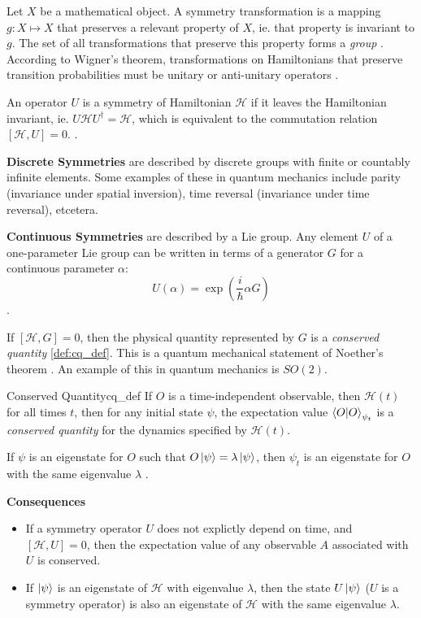 \documentclass{article}
\newcommand{\hamiltonian}{\mathcal{H}}
\begin{document}
Let $X$ be a mathematical object. A symmetry transformation is a mapping $g: X \mapsto X$ that preserves a relevant property of $X$, ie. that property is invariant to $g$. The set of all transformations that preserve this property forms a \textit{group} \cite{cantwell2016introduction}. According to Wigner's theorem, transformations on Hamiltonians that preserve transition probabilities must be unitary or anti-unitary operators \cite{corry2017symmetry}.

An operator $U$ is a symmetry of Hamiltonian $\hamiltonian$ if it leaves the Hamiltonian invariant, ie. $U\hamiltonian U^\dagger =\hamiltonian$, which is equivalent to the commutation relation $[\hamiltonian, U] = 0$. \cite{corry2017symmetry}.

\textbf{Discrete Symmetries} are described by discrete groups with finite or countably infinite elements. Some examples of these in quantum mechanics include parity (invariance under spatial inversion), time reversal (invariance under time reversal), etcetera.

\textbf{Continuous Symmetries} are described by a Lie group. Any element $U$ of a one-parameter Lie group can be written in terms of a generator $G$ for a continuous parameter $\alpha$: $$U(\alpha) = \exp\left(\frac{i}{\hslash}\alpha G\right)$$.

If $[\hamiltonian, G] = 0$, then the physical quantity represented by $G$ is a \textit{conserved quantity} \ref{def:cq_def}. This is a quantum mechanical statement of Noether's theorem \cite{ouderaaNoethersRazorLearning2024}. An example of this in quantum mechanics is $SO(2)$.\\

\begin{definition}{Conserved Quantity}{cq_def}
If $O$ is a time-independent observable, then $\hamiltonian(t)$ for all times $t$, then for any initial state $\psi$, the expectation value $\braket{O}_{\psi_t}$ is a \textit{conserved quantity} for the dynamics specified by $\hamiltonian(t)$.

If $\psi$ is an eigenstate for $O$ such that $O\ket{\psi} = \lambda \ket{\psi}$, then $\psi_t$ is an eigenstate for $O$ with the same eigenvalue $\lambda$ \cite{corry2017symmetry}.
\end{definition}

\textbf{Consequences}
\begin{itemize}
    \item If a symmetry operator $U$ does not explictly depend on time, and $[\hamiltonian, U] = 0$, then the expectation value of any observable $A$ associated with $U$ is conserved.
    \item If $\ket{\psi}$ is an eigenstate of $\hamiltonian$ with eigenvalue $\lambda$, then the state $U\ket{\psi}$ ($U$ is a symmetry operator) is also an eigenstate of $\hamiltonian$ with the same eigenvalue $\lambda$.
\end{itemize}
\end{document}
